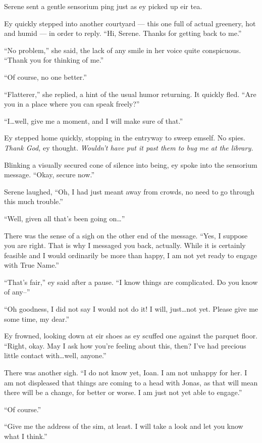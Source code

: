 Serene sent a gentle sensorium ping just as ey picked up eir tea.

Ey quickly stepped into another courtyard — this one full of actual greenery, hot and humid — in order to reply. ``Hi, Serene. Thanks for getting back to me.''

``No problem,'' she said, the lack of any smile in her voice quite conspicuous. ``Thank you for thinking of me.''

``Of course, no one better.''

``Flatterer,'' she replied, a hint of the usual humor returning. It quickly fled. ``Are you in a place where you can speak freely?''

``I\ldots well, give me a moment, and I will make sure of that.''

Ey stepped home quickly, stopping in the entryway to sweep emself. No spies. \emph{Thank God,} ey thought. \emph{Wouldn't have put it past them to bug me at the library.}

Blinking a visually secured cone of silence into being, ey spoke into the sensorium message. ``Okay, secure now.''

Serene laughed, ``Oh, I had just meant away from crowds, no need to go through this much trouble.''

``Well, given all that's been going on\ldots{}''

There was the sense of a sigh on the other end of the message. ``Yes, I suppose you are right. That is why I messaged you back, actually. While it is certainly feasible and I would ordinarily be more than happy, I am not yet ready to engage with True Name.''

``That's fair,'' ey said after a pause. ``I know things are complicated. Do you know of any--''

``Oh goodness, I did not say I would not do it! I will, just\ldots not yet. Please give me some time, my dear.''

Ey frowned, looking down at eir shoes as ey scuffed one against the parquet floor. ``Right, okay. May I ask how you're feeling about this, then? I've had precious little contact with\ldots well, anyone.''

There was another sigh. ``I do not know yet, Ioan. I am not unhappy for her. I am not displeased that things are coming to a head with Jonas, as that will mean there will be a change, for better or worse. I am just not yet able to engage.''

``Of course.''

``Give me the address of the sim, at least. I will take a look and let you know what I think.''

